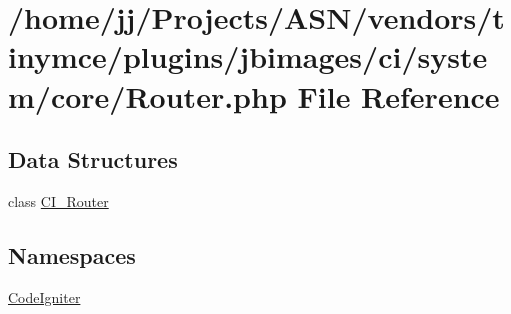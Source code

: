 \hypertarget{_router_8php}{}\section{/home/jj/\+Projects/\+A\+S\+N/vendors/tinymce/plugins/jbimages/ci/system/core/\+Router.php File Reference}
\label{_router_8php}
\subsection*{Data Structures}
\begin{DoxyCompactItemize}
\item 
class \hyperlink{class_c_i___router}{C\+I\+\_\+\+Router}
\end{DoxyCompactItemize}
\subsection*{Namespaces}
\begin{DoxyCompactItemize}
\item 
 \hyperlink{namespace_code_igniter}{Code\+Igniter}
\end{DoxyCompactItemize}
